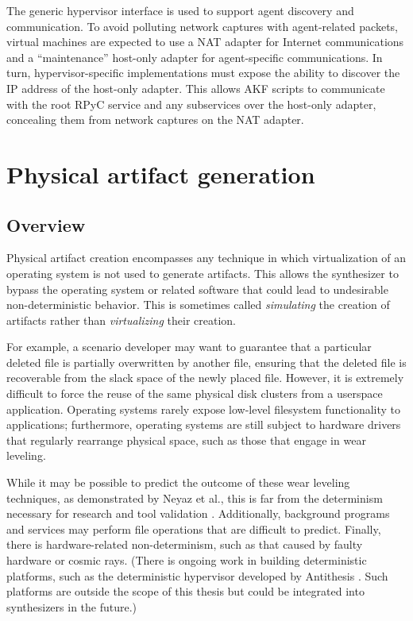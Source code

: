 \documentclass[letterpaper,12pt]{report}
\begin{document}
The generic hypervisor interface is used to support agent discovery and
communication. To avoid polluting network captures with agent-related
packets, virtual machines are expected to use a NAT adapter for Internet
communications and a ``maintenance'' host-only adapter for
agent-specific communications. In turn, hypervisor-specific
implementations must expose the ability to discover the IP address of
the host-only adapter. This allows AKF scripts to communicate with the
root RPyC service and any subservices over the host-only adapter,
concealing them from network captures on the NAT adapter.

\section{Physical artifact
generation}\label{physical-artifact-generation}

\subsection{Overview}\label{overview}

Physical artifact creation encompasses any technique in which
virtualization of an operating system is not used to generate artifacts.
This allows the synthesizer to bypass the operating system or related
software that could lead to undesirable non-deterministic behavior. This
is sometimes called \emph{simulating} the creation of artifacts rather
than \emph{virtualizing} their creation.

For example, a scenario developer may want to guarantee that a
particular deleted file is partially overwritten by another file,
ensuring that the deleted file is recoverable from the slack space of
the newly placed file. However, it is extremely difficult to force the
reuse of the same physical disk clusters from a userspace application.
Operating systems rarely expose low-level filesystem functionality to
applications; furthermore, operating systems are still subject to
hardware drivers that regularly rearrange physical space, such as those
that engage in wear leveling.

While it may be possible to predict the outcome of these wear leveling
techniques, as demonstrated by Neyaz et al., this is far from the
determinism necessary for research and tool validation
\cite{neyazForensicAnalysisWear2018}. Additionally, background
programs and services may perform file operations that are difficult to
predict. Finally, there is hardware-related non-determinism, such as
that caused by faulty hardware or cosmic rays. (There is ongoing work in
building deterministic platforms, such as the deterministic hypervisor
developed by Antithesis \cite{pshenichkinYouThinkYou2024}. Such
platforms are outside the scope of this thesis but could be integrated
into synthesizers in the future.)
\end{document}
